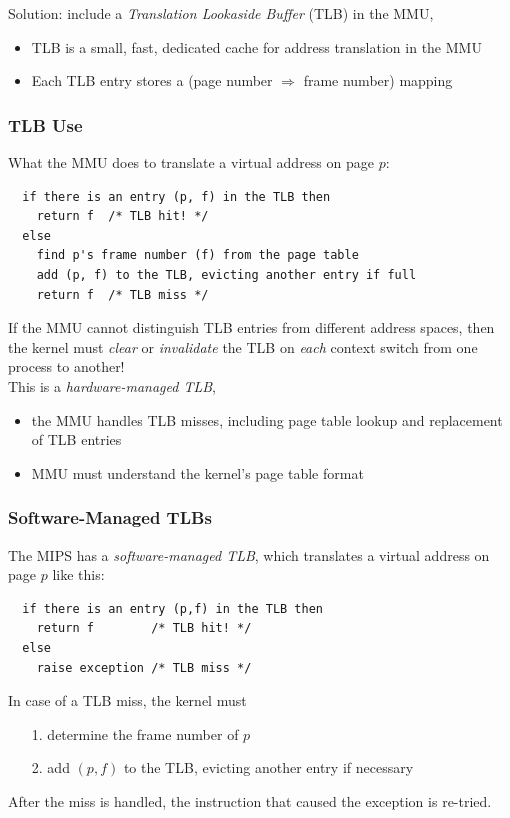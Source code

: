 \documentclass[12pt]{article}
\theoremstyle{plain}
\theoremstyle{definition}
\begin{document}
Solution: include a \emph{Translation Lookaside Buffer} (TLB) in the MMU,
\begin{itemize}
  \item TLB is a small, fast, dedicated cache for address translation in the MMU
  \item Each TLB entry stores a (page number $\Rightarrow$ frame number) mapping
\end{itemize}

\subsubsection{TLB Use}
What the MMU does to translate a virtual address on page $p$:
\begin{verbatim}
  if there is an entry (p, f) in the TLB then
    return f  /* TLB hit! */
  else
    find p's frame number (f) from the page table
    add (p, f) to the TLB, evicting another entry if full
    return f  /* TLB miss */
\end{verbatim}
If the MMU cannot distinguish TLB entries from different address spaces, then the kernel must \emph{clear} or \emph{invalidate} the TLB on \emph{each} context switch from one process to another! \\

This is a \emph{hardware-managed TLB},
\begin{itemize}
  \item the MMU handles TLB misses, including page table lookup and replacement of TLB entries
  \item MMU must understand the kernel's page table format
\end{itemize}

\subsubsection{Software-Managed TLBs}
The MIPS has a \emph{software-managed TLB}, which translates a virtual address on page $p$ like this:
\begin{verbatim}
  if there is an entry (p,f) in the TLB then
    return f        /* TLB hit! */
  else
    raise exception /* TLB miss */
\end{verbatim}
In case of a TLB miss, the kernel must
\begin{enumerate}
  \item[1.] determine the frame number of $p$
  \item[2.] add $(p, f)$ to the TLB, evicting another entry if necessary
\end{enumerate}
After the miss is handled, the instruction that caused the exception is re-tried.
\end{document}
